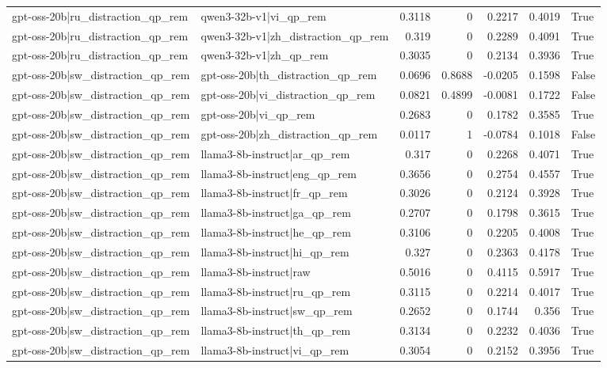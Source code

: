 \begin{table}
\begin{tabular}{l l r r r r l}
gpt-oss-20b|ru_distraction_qp_rem & qwen3-32b-v1|vi_qp_rem & 0.3118 & 0 & 0.2217 & 0.4019 & True \\
gpt-oss-20b|ru_distraction_qp_rem & qwen3-32b-v1|zh_distraction_qp_rem & 0.319 & 0 & 0.2289 & 0.4091 & True \\
gpt-oss-20b|ru_distraction_qp_rem & qwen3-32b-v1|zh_qp_rem & 0.3035 & 0 & 0.2134 & 0.3936 & True \\
gpt-oss-20b|sw_distraction_qp_rem & gpt-oss-20b|th_distraction_qp_rem & 0.0696 & 0.8688 & -0.0205 & 0.1598 & False \\
gpt-oss-20b|sw_distraction_qp_rem & gpt-oss-20b|vi_distraction_qp_rem & 0.0821 & 0.4899 & -0.0081 & 0.1722 & False \\
gpt-oss-20b|sw_distraction_qp_rem & gpt-oss-20b|vi_qp_rem & 0.2683 & 0 & 0.1782 & 0.3585 & True \\
gpt-oss-20b|sw_distraction_qp_rem & gpt-oss-20b|zh_distraction_qp_rem & 0.0117 & 1 & -0.0784 & 0.1018 & False \\
gpt-oss-20b|sw_distraction_qp_rem & llama3-8b-instruct|ar_qp_rem & 0.317 & 0 & 0.2268 & 0.4071 & True \\
gpt-oss-20b|sw_distraction_qp_rem & llama3-8b-instruct|eng_qp_rem & 0.3656 & 0 & 0.2754 & 0.4557 & True \\
gpt-oss-20b|sw_distraction_qp_rem & llama3-8b-instruct|fr_qp_rem & 0.3026 & 0 & 0.2124 & 0.3928 & True \\
gpt-oss-20b|sw_distraction_qp_rem & llama3-8b-instruct|ga_qp_rem & 0.2707 & 0 & 0.1798 & 0.3615 & True \\
gpt-oss-20b|sw_distraction_qp_rem & llama3-8b-instruct|he_qp_rem & 0.3106 & 0 & 0.2205 & 0.4008 & True \\
gpt-oss-20b|sw_distraction_qp_rem & llama3-8b-instruct|hi_qp_rem & 0.327 & 0 & 0.2363 & 0.4178 & True \\
gpt-oss-20b|sw_distraction_qp_rem & llama3-8b-instruct|raw & 0.5016 & 0 & 0.4115 & 0.5917 & True \\
gpt-oss-20b|sw_distraction_qp_rem & llama3-8b-instruct|ru_qp_rem & 0.3115 & 0 & 0.2214 & 0.4017 & True \\
gpt-oss-20b|sw_distraction_qp_rem & llama3-8b-instruct|sw_qp_rem & 0.2652 & 0 & 0.1744 & 0.356 & True \\
gpt-oss-20b|sw_distraction_qp_rem & llama3-8b-instruct|th_qp_rem & 0.3134 & 0 & 0.2232 & 0.4036 & True \\
gpt-oss-20b|sw_distraction_qp_rem & llama3-8b-instruct|vi_qp_rem & 0.3054 & 0 & 0.2152 & 0.3956 & True \\

\end{tabular}
\end{table}
